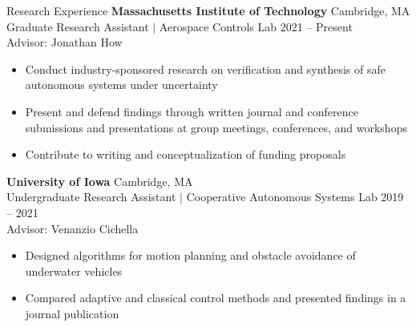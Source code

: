 \begin{rSection}{Research Experience}
{\bf Massachusetts Institute of Technology} \hfill Cambridge, MA \\ 
Graduate Research Assistant $|$ Aerospace Controls Lab \hfill 2021 -- Present \\
Advisor: Jonathan How
\begin{itemize}
    \item Conduct industry-sponsored research on verification and synthesis of safe autonomous systems under uncertainty
    \item Present and defend findings through written journal and conference submissions and presentations at group meetings, conferences, and workshops 
    \item Contribute to writing and conceptualization of funding proposals
\end{itemize}

\iffalse
{\bf United States Navy} \hfill Panama City, FL \\ 
Research Intern $|$ Naval Surface Warefare Center Panama City Division \hfill 2021 \\
Advisor: Patrick Walters
\begin{itemize}
    \item Designed algorithms for motion planning and obstacle avoidance of underwater vehicles
    \item Compared adaptive and classical control methods and presented findings in a journal publication
\end{itemize}
\fi

{\bf University of Iowa} \hfill Cambridge, MA \\ 
Undergraduate Research Assistant $|$ Cooperative Autonomous Systems Lab \hfill 2019 -- 2021 \\
Advisor: Venanzio Cichella
\begin{itemize}
    \item Designed algorithms for motion planning and obstacle avoidance of underwater vehicles
    \item Compared adaptive and classical control methods and presented findings in a journal publication
\end{itemize}

\end{rSection}